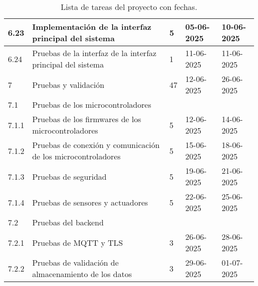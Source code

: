 \begin{table}[ht]
\begin{tabularx}{\linewidth}{|p{1cm}|p{10cm}|p{1cm}|p{1.8cm}|p{1.8cm}|}
		6.23  & Implementación de la interfaz principal del sistema                   & 5     & 05-06-2025 & 10-06-2025 \\ \hline
		6.24  & Pruebas de la interfaz de la interfaz principal del sistema           & 1     & 11-06-2025 & 11-06-2025 \\ \hline
		7     & Pruebas y validación                                                  & 47    & 12-06-2025 & 26-06-2025 \\ \hline
		7.1   & Pruebas de los microcontroladores                                     &       &            &            \\ \hline
		7.1.1 & Pruebas de los firmwares de los microcontroladores                    & 5     & 12-06-2025 & 14-06-2025 \\ \hline
		7.1.2 & Pruebas de conexión y comunicación de los microcontroladores          & 5     & 15-06-2025 & 18-06-2025 \\ \hline
		7.1.3 & Pruebas de seguridad                                                  & 5     & 19-06-2025 & 21-06-2025 \\ \hline
		7.1.4 & Pruebas de sensores y actuadores                                      & 5     & 22-06-2025 & 25-06-2025 \\ \hline
		7.2   & Pruebas del backend                                                   &       &            &            \\ \hline
		7.2.1 & Pruebas de MQTT y TLS                                                 & 3     & 26-06-2025 & 28-06-2025 \\ \hline
		7.2.2 & Pruebas de validación de almacenamiento de los datos                  & 3     & 29-06-2025 & 01-07-2025 \\ \hline
	\end{tabularx}
	\caption{Lista de tareas del proyecto con fechas.}
	\label{tab:tabGantt}
\end{table}

